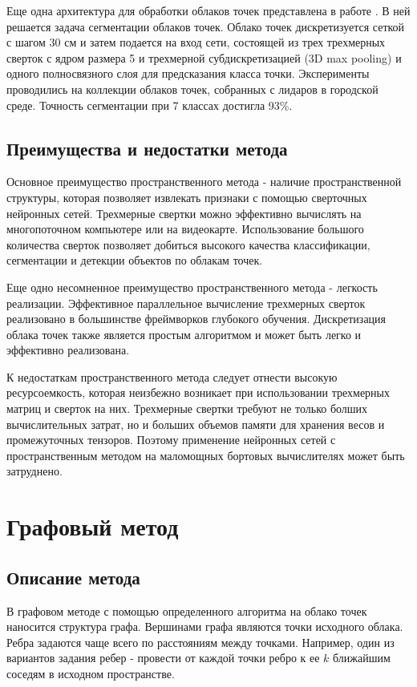 \documentclass[]{article}
\begin{document}
Еще одна архитектура для обработки облаков точек представлена в работе \cite{huang2016point}. В ней решается задача сегментации облаков точек. Облако точек дискретизуется сеткой с шагом 30 см и затем подается на вход сети, состоящей из трех трехмерных сверток с ядром размера 5 и трехмерной субдискретизацией (3D max pooling) и одного полносвязного слоя для предсказания класса точки. Эксперименты проводились на коллекции облаков точек, собранных с лидаров в городской среде. Точность сегментации при 7 классах достигла 93\%.

\subsection{Преимущества и недостатки метода}

Основное преимущество пространственного метода - наличие пространственной структуры, которая позволяет извлекать признаки с помощью сверточных нейронных сетей. Трехмерные свертки можно эффективно вычислять на многопоточном компьютере или на видеокарте. Использование большого количества сверток позволяет добиться высокого качества классификации, сегментации и детекции объектов по облакам точек.

Еще одно несомненное преимущество пространственного метода - легкость реализации. Эффективное параллельное вычисление трехмерных сверток реализовано в большинстве фреймворков глубокого обучения. Дискретизация облака точек также является простым алгоритмом и может быть легко и эффективно реализована.

К недостаткам пространственного метода следует отнести высокую ресурсоемкость, которая неизбежно возникает при использовании трехмерных матриц и сверток на них. Трехмерные свертки требуют не только болших вычислительных затрат, но и больших объемов памяти для хранения весов и промежуточных тензоров. Поэтому применение нейронных сетей с пространственным методом на маломощных бортовых вычислителях может быть затруднено.

\section{Графовый метод}

\subsection{Описание метода}

В графовом методе с помощью определенного алгоритма на облако точек наносится структура графа. Вершинами графа являются точки исходного облака. Ребра задаются чаще всего по расстояниям между точками. Например, один из вариантов задания ребер - провести от каждой точки ребро к ее $k$ ближайшим соседям в исходном пространстве.
\end{document}
